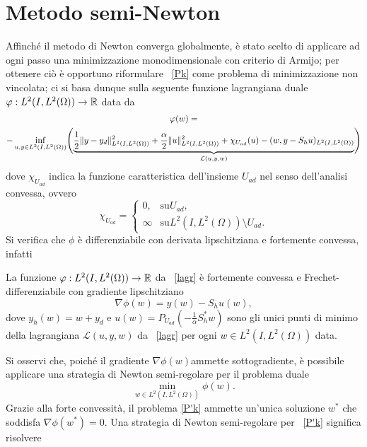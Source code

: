 \section{Metodo semi-Newton}
Affinché il metodo di Newton converga globalmente, è stato scelto di applicare ad ogni passo una minimizzazione monodimensionale con criterio di Armijo; per ottenere ciò è opportuno riformulare ~\eqref{Pk} come problema di minimizzazione non vincolata; ci si basa dunque sulla seguente funzione lagrangiana duale $ \varphi:L^2(I,L^2(\Omega))\to \mathbb{R} $ data da
\begin{multline}
\label{lagr}
\varphi(w)= \\
-\inf_{u,y\in L^2(I,L^2(\Omega))}\Biggl( \underbrace{\frac{1}{2}\lVert y-y_d\rVert^2_{L^2(I,L^2(\Omega))} + \frac{\alpha}{2}\lVert u\rVert^2_{L^2(I,L^2(\Omega))}  + \chi_{U_{ad}}(u) - (w,y-S_hu)_{L^2(I,L^2(\Omega))}}_{\mathcal{L}(u,y,w)}\Biggr)
\end{multline}
dove $ \chi_{U_{ad}} $ indica la funzione caratteristica dell'insieme $ U_{ad} $ nel senso dell'analisi convessa, ovvero
\begin{equation}
\chi_{U_{ad}}=
\begin{cases}
0,        &\text{su} U_{ad},\\
\infty   &\text{su} L^2(I,L^2(\Omega))\setminus U_{ad}.
\end{cases}
\end{equation}
Si verifica che $ \phi $ è differenziabile con derivata lipschitziana e fortemente convessa, infatti
\begin{lemma}
\label{phi}
La funzione $ \varphi:L^2(I,L^2(\Omega))\to\mathbb{R} $ da ~\eqref{lagr} è fortemente convessa e Frechet-differenziabile con gradiente lipschitziano
\begin{equation}
\nabla\phi(w)=y(w)-S_hu(w),
\end{equation}
dove $ y_h(w)=w+y_d $ e $ u(w)=P_{U_{ad}}(-\frac{1}{\alpha}S^*_hw) $ sono gli unici punti di minimo della lagrangiana $ \mathcal{L}(u,y,w) $ da ~\eqref{lagr} per ogni $ w\in L^2(I,L^2(\Omega)) $ data.
\end{lemma}
Si osservi che, poiché il gradiente $ \nabla\phi(w) $ammette sottogradiente, è possibile applicare una strategia di Newton semi-regolare per il problema duale 
\begin{equation}
\label{P'k}
\min_{w\in L^2(I,L^2(\Omega))} \phi(w).
\end{equation}
Grazie alla forte convessità, il problema \eqref{P'k} ammette un'unica soluzione $ w^* $ che soddisfa $ \nabla\phi(w^*)=0 $.
Una strategia di Newton semi-regolare per ~\eqref{P'k} significa risolvere 
